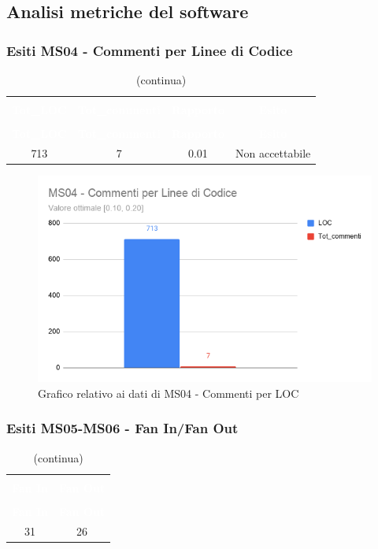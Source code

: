 \pagebreak
\subsection{Analisi metriche del software}
\subsubsection{Esiti MS04 - Commenti per Linee di Codice}
\begin{longtable}{c c c c}
\rowcolor{white}\caption{Esiti MS04} \\
	\rowcolor{redafk}
	\textcolor{white}{\textbf{Tot\_LOC}} &
	\textcolor{white}{\textbf{Tot\_commenti}} &
\textcolor{white}{\textbf{Rapporto}} &
\textcolor{white}{\textbf{Esito}} \\
	\endfirsthead
		\rowcolor{white}\caption[]{(continua)} \\
		\rowcolor{redafk}
		\textcolor{white}{\textbf{Tot\_LOC}} &
\textcolor{white}{\textbf{Tot\_commenti}} &
\textcolor{white}{\textbf{Rapporto}} & 
\textcolor{white}{\textbf{Esito}} \\
	\endhead
	713 & 7 & 0.01 & Non accettabile\\	
\end{longtable}

\begin{figure}[H]
\centering
\includegraphics[scale=0.40]{./img/MS04.png}
\caption{Grafico relativo ai dati di MS04 - Commenti per LOC}
\end{figure}

\subsubsection{Esiti MS05-MS06 - Fan In/Fan Out}
\begin{longtable}{c c}
\rowcolor{white}\caption{Esiti MS05-MS06} \\
	\rowcolor{redafk}
	\textcolor{white}{\textbf{Fan In}} &
	\textcolor{white}{\textbf{Fan Out}}\\
	\endfirsthead
		\rowcolor{white}\caption[]{(continua)} \\
		\rowcolor{redafk}
	\textcolor{white}{\textbf{Fan In}} &
	\textcolor{white}{\textbf{Fan Out}}\\
	\endhead
	31 & 26\\	
\end{longtable}

